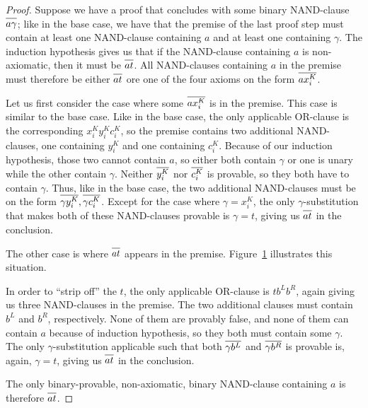 \begin{proof}
Suppose we have a proof that concludes with some binary NAND-clause $\ol{a\gamma}$;
like in the base case, we have that the premise of the last proof step must contain at least one NAND-clause containing $a$ and at least one containing $\gamma$.
The induction hypothesis gives us that if the NAND-clause containing $a$ is non-axiomatic, then it must be $\ol{at}$.
All NAND-clauses containing $a$ in the premise must therefore be either $\ol{at}$ ore one of the four axioms on the form $\ol{ax^K_i}$.

Let us first consider the case where some $\ol{ax^K_i}$ is in the premise.
This case is similar to the base case.
Like in the base case, the only applicable OR-clause is the corresponding $x^K_iy^K_ic^K_i$, so the premise contains two additional NAND-clauses, one containing $y^K_i$ and one containing $c^K_i$.
Because of our induction hypothesis, those two cannot contain $a$, so either both contain $\gamma$ or one is unary while the other contain $\gamma$.
Neither $\ol{y^K_i}$ nor $\ol{c^K_i}$ is provable, so they both have to contain $\gamma$.
Thus, like in the base case, the two additional NAND-clauses must be on the form $\ol{\gamma y^K_i},\ol{\gamma c^K_i}$.
Except for the case where $\gamma = x^K_i$, the only $\gamma$-substitution that makes both of these NAND-clauses provable is $\gamma = t$, giving us $\ol{at}$ in the conclusion.

The other case is where $\ol{at}$ appears in the premise.
Figure~\ref{fig:nand_inductive_step} illustrates this situation.\par
\begin{figure}[!h]
  \centering
  \begin{prooftree*}
    \Hypo{\dots}
    \Hypo{\dots}
  \end{prooftree*}
  \caption{}
  \label{fig:nand_inductive_step}
\end{figure}
In order to ``strip off'' the $t$, the only applicable OR-clause is $tb^Lb^R$, again giving us three NAND-clauses in the premise.
The two additional clauses must contain $b^L$ and $b^R$, respectively.
None of them are provably false, and none of them can contain $a$ because of induction hypothesis, so they both must contain some $\gamma$.
The only $\gamma$-substitution applicable such that both $\ol{\gamma b^L}$ and $\ol{\gamma b^R}$ is provable is, again, $\gamma = t$, giving us $\ol{at}$ in the conclusion.

The only binary-provable, non-axiomatic, binary NAND-clause containing $a$ is therefore $\ol{at}$.
\end{proof}

